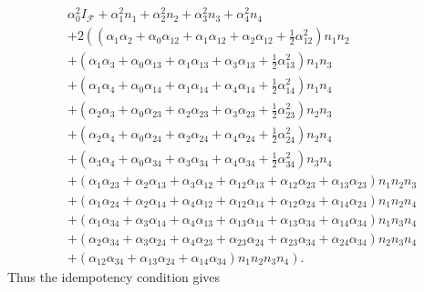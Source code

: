 \documentclass[aps,preprint]{revtex4}%
\begin{document}
\begin{align}
&  \alpha_{0}^{2}I_{\mathcal{F}}+\alpha_{1}^{2}n_{1}+\alpha_{2}^{2}%
n_{2}+\alpha_{3}^{2}n_{3}+\alpha_{4}^{2}n_{4}\nonumber\\
&  +2\left(  \left(  \alpha_{1}\alpha_{2}+\alpha_{0}\alpha_{12}+\alpha
_{1}\alpha_{12}+\alpha_{2}\alpha_{12}+\frac{1}{2}\alpha_{12}^{2}\right)
n_{1}n_{2}\right. \nonumber\\
&  +\left(  \alpha_{1}\alpha_{3}+\alpha_{0}\alpha_{13}+\alpha_{1}\alpha
_{13}+\alpha_{3}\alpha_{13}+\frac{1}{2}\alpha_{13}^{2}\right)  n_{1}%
n_{3}\nonumber\\
&  +\left(  \alpha_{1}\alpha_{4}+\alpha_{0}\alpha_{14}+\alpha_{1}\alpha
_{14}+\alpha_{4}\alpha_{14}+\frac{1}{2}\alpha_{14}^{2}\right)  n_{1}%
n_{4}\nonumber\\
&  +\left(  \alpha_{2}\alpha_{3}+\alpha_{0}\alpha_{23}+\alpha_{2}\alpha
_{23}+\alpha_{3}\alpha_{23}+\frac{1}{2}\alpha_{23}^{2}\right)  n_{2}%
n_{3}\nonumber\\
&  +\left(  \alpha_{2}\alpha_{4}+\alpha_{0}\alpha_{24}+\alpha_{2}\alpha
_{24}+\alpha_{4}\alpha_{24}+\frac{1}{2}\alpha_{24}^{2}\right)  n_{2}%
n_{4}\nonumber\\
&  +\left(  \alpha_{3}\alpha_{4}+\alpha_{0}\alpha_{34}+\alpha_{3}\alpha
_{34}+\alpha_{4}\alpha_{34}+\frac{1}{2}\alpha_{34}^{2}\right)  n_{3}%
n_{4}\nonumber\\
&  +\left(  \alpha_{1}\alpha_{23}+\alpha_{2}\alpha_{13}+\alpha_{3}\alpha
_{12}+\alpha_{12}\alpha_{13}+\alpha_{12}\alpha_{23}+\alpha_{13}\alpha
_{23}\right)  n_{1}n_{2}n_{3}\nonumber\\
&  +\left(  \alpha_{1}\alpha_{24}+\alpha_{2}\alpha_{14}+\alpha_{4}\alpha
_{12}+\alpha_{12}\alpha_{14}+\alpha_{12}\alpha_{24}+\alpha_{14}\alpha
_{24}\right)  n_{1}n_{2}n_{4}\nonumber\\
&  +\left(  \alpha_{1}\alpha_{34}+\alpha_{3}\alpha_{14}+\alpha_{4}\alpha
_{13}+\alpha_{13}\alpha_{14}+\alpha_{13}\alpha_{34}+\alpha_{14}\alpha
_{34}\right)  n_{1}n_{3}n_{4}\nonumber\\
&  +\left(  \alpha_{2}\alpha_{34}+\alpha_{3}\alpha_{24}+\alpha_{4}\alpha
_{23}+\alpha_{23}\alpha_{24}+\alpha_{23}\alpha_{34}+\alpha_{24}\alpha
_{34}\right)  n_{2}n_{3}n_{4}\nonumber\\
&  +\left.  \left(  \alpha_{12}\alpha_{34}+\alpha_{13}\alpha_{24}+\alpha
_{14}\alpha_{34}\right)  n_{1}n_{2}n_{3}n_{4}\right)  .
\end{align}
Thus the idempotency condition gives
\end{document}
